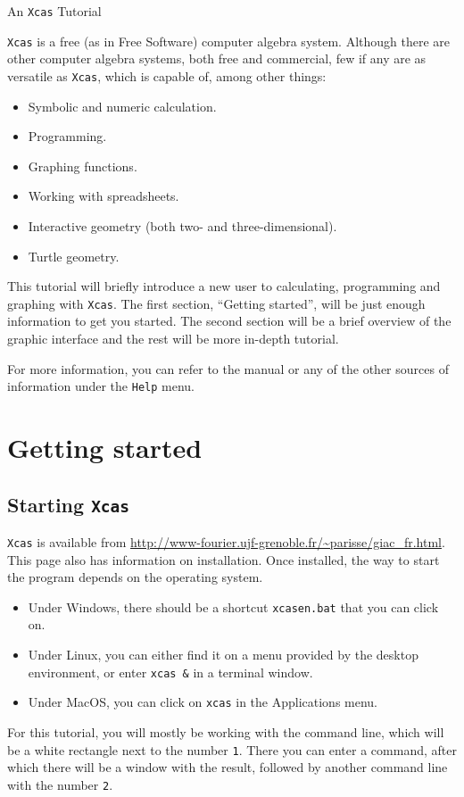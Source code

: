 \documentclass{article}
\begin{document}
\vspace*{1cm}
\begin{center}
{\Huge An \texttt{Xcas} Tutorial}
\end{center}

\tableofcontents

\newpage

\texttt{Xcas} is a free (as in Free Software) computer algebra system.
Although there are other computer algebra systems, both free and
commercial, few if any are as versatile as \texttt{Xcas},
which is capable of, among other things:
\begin{itemize}
  \item
  Symbolic and numeric calculation.
  \item
  Programming.
  \item
  Graphing functions.
  \item
  Working with spreadsheets.
  \item
  Interactive geometry (both two- and three-dimensional).
  \item
  Turtle geometry.
\end{itemize}
This tutorial will briefly introduce a new user to calculating,
programming and graphing with \texttt{Xcas}.  The first section, 
``Getting started'', will be just enough information to get you
started.  The second section will be a brief overview of the
graphic interface and the rest will be more in-depth tutorial.

For more information, you can refer to the manual or any of the other
sources of information under the \texttt{Help} menu.

\section{Getting started}

\subsection{Starting \texttt{Xcas}}

\texttt{Xcas} is available from 
\url{http://www-fourier.ujf-grenoble.fr/~parisse/giac_fr.html}.
This page also has information on installation.  Once installed, the
way to start the program depends on the operating system.
\begin{itemize}
  \item
  Under Windows, there should be a shortcut \texttt{xcasen.bat} that
  you can click on.
  \item
  Under Linux, you can either find it on a menu provided by the
  desktop environment, or enter \texttt{xcas \&} in a terminal window.
  \item
  Under MacOS, you can click on \texttt{xcas} in the Applications menu.
\end{itemize}
For this tutorial, you will mostly be working with the
command line, which will be a white rectangle next to the number
\texttt{1}.  There you can enter a command, after which there will be
a window with the result, followed by another command line with the
number \texttt{2}.
\end{document}
